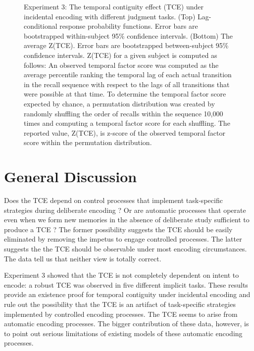 \documentclass[man,natbib,floatsintext]{apa6} %
\begin{document}
\begin{figure}%
\caption{Experiment 3: The temporal contiguity effect (TCE) under incidental encoding with different judgment tasks. (Top) Lag-conditional response probability functions. Error bars are bootstrapped within-subject 95\% confidence intervals. (Bottom) The average Z(TCE).  Error bars are bootstrapped between-subject 95\% confidence intervals. Z(TCE) for a given subject is computed as follows: An observed temporal factor score was computed as the average percentile ranking the temporal lag of each actual transition in the recall sequence with respect to the lags of all transitions that were possible at that time. To determine the temporal factor score expected by chance, a permutation distribution was created by randomly shuffling the order of recalls within the sequence 10,000 times and computing a temporal factor score for each shuffling. The reported value, Z(TCE), is z-score of the observed temporal factor score within the permutation distribution.}
\label{E3}
\end{figure}









\section{General Discussion}
Does the TCE depend on control processes that implement task-specific strategies during deliberate encoding \citep{Hint16}? Or are automatic processes that operate even when we form new memories in the absence of deliberate study sufficient to produce a TCE \citep{HealKaha17}? The former possibility suggests the TCE should be easily eliminated by removing the impetus to engage controlled processes. The latter suggests the the TCE should be observable under most encoding circumstances. The data tell us that neither view is totally correct.

Experiment 3 showed that the TCE is not completely dependent on intent to encode: a robust TCE was observed in five different implicit tasks. These results provide an existence proof for temporal contiguity under incidental encoding and rule out the possibility that the TCE is an artifact of task-specific strategies implemented by controlled encoding processes. The TCE seems to arise from automatic encoding processes. The bigger contribution of these data, however, is to point out serious limitations of existing models of these automatic encoding processes. 
\end{document}
